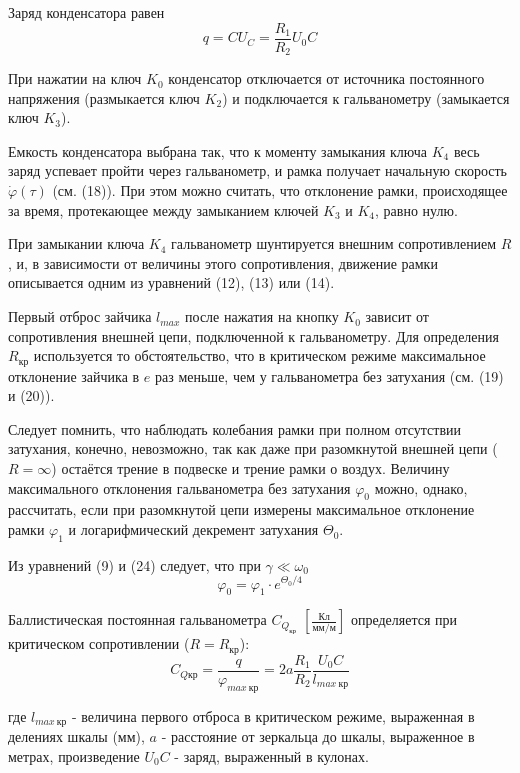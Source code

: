 \documentclass[14pt]{article}
\begin{document}
Заряд конденсатора равен
\begin{equation}
	q = CU_C = \frac{R_1}{R_2}U_0C
\end{equation}

При нажатии на ключ $K_0$ конденсатор отключается от источника постоянного напряжения (размыкается ключ $K_2$) и подключается к гальванометру (замыкается ключ $K_3$).

Емкость конденсатора выбрана так, что к моменту замыкания ключа $K_4$ весь заряд успевает пройти через гальванометр, и рамка получает начальную скорость 
$\dot{\varphi}(\tau)$ (см. (18)). При этом можно считать, что отклонение рамки, происходящее за время, протекающее между замыканием ключей $K_3$ и $K_4$, равно нулю.

При замыкании ключа $K_4$ гальванометр шунтируется внешним сопротивлением $R$, и, в зависимости от величины этого сопротивления, движение рамки описывается одним из уравнений (12), (13) или (14).

Первый отброс зайчика $l_{max}$ после нажатия на кнопку $K_0$ зависит от сопротивления внешней цепи, подключенной к гальванометру. Для определения $R_{\text{кр}}$ используется то обстоятельство, что в критическом режиме максимальное отклонение зайчика в $e$ раз меньше, чем у гальванометра без затухания (см. (19) и (20)).

Следует помнить, что наблюдать колебания рамки при полном отсутствии затухания, конечно, невозможно, так как даже при разомкнутой внешней цепи ($R = \infty$) остаётся трение в подвеске и трение рамки о воздух. Величину максимального отклонения гальванометра без затухания $\varphi_0$ можно, однако, рассчитать, если при разомкнутой цепи измерены максимальное отклонение рамки $\varphi_1$ и логарифмический декремент затухания $\Theta_0$.

Из уравнений (9) и (24) следует, что при $\gamma \ll \omega_0$
\begin{equation}
	\varphi_0 = \varphi_1\cdot e^{\Theta_0/4}
\end{equation}

Баллистическая постоянная гальванометра $C_{Q_{\text{кр}}}$ $\left[\frac{\text{Кл}}{\text{мм}/\text{м}}\right]$ определяется
при критическом сопротивлении ($R = R_{\text{кр}}$):
\begin{equation}
	C_{Q\text{кр}} = \frac{q}{\varphi_{max~\text{кр}}} = 2a\frac{R_1}{R_2}\frac{U_0C}{l_{max~\text{кр}}}
\end{equation}

где $l_{max~\text{кр}}$ - величина первого отброса в критическом режиме, выраженная в делениях шкалы (мм), $a$ - расстояние от зеркальца до шкалы, выраженное в метрах, произведение $U_0C$ - заряд, выраженный в кулонах.
\end{document}
